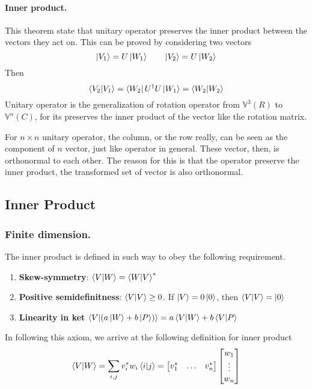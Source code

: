 \documentclass[../main.tex]{subfiles}
\begin{document}
\paragraph*{Inner product.} This theorem state that unitary operator preserves the inner product between the vectors they act on.
This can be proved by considering two vectors
\begin{equation*}
	\ket{V_1}=U \ket{W_1}\qquad \ket{V_2}=U \ket{W_2}
\end{equation*}
Then
\begin{equation*}
	\braket{V_2|V_1}=\bra{W_2}U ^\dagger U \ket{W_1}=\braket{W_2|W_2}
\end{equation*}
Unitary operator is the generalization of rotation operator from $\mathbb{V}^3(R)$ to $\mathbb{V}^n(C)$, for its preserves the inner product of the vector like the rotation matrix.

For $n\times n$ unitary operator, the column, or the row really, can be seen as the component of $n$ vector, just like operator in general.
These vector, then, is orthonormal to each other.
The reason for this is that the operator preserve the inner product, the transformed set of vector is also orthonormal.

\subsection*{Inner Product}
\subsubsection*{Finite dimension.}
The inner product is defined in such way to obey the following requirement.
\begin{enumerate}
	\item \textbf{Skew-symmetry}: $\braket{V|W}=\braket{W|V}^*$
	\item \textbf{Positive semidefinitness}: $\braket{V|V}\geq 0$. If $\ket{V}=0\ket{0}$, then $\braket{V|V}=\ket{0}$
	\item \textbf{Linearity in ket} $\braket{V|(a \ket{W}+b \ket{P})}=a\braket{V|W}+b\braket{V|P}$
\end{enumerate}
In following this axiom, we arrive at the following definition for inner product
\begin{equation*}
	\braket{V|W}=\sum_{i,j}v_i^*w_i\braket{i|j}=\begin{bmatrix}
		v_1^* & \dots & v_n^*
	\end{bmatrix}
	\begin{bmatrix}
		w_1    \\
		\vdots \\
		w_n
	\end{bmatrix}
\end{equation*}
\end{document}
